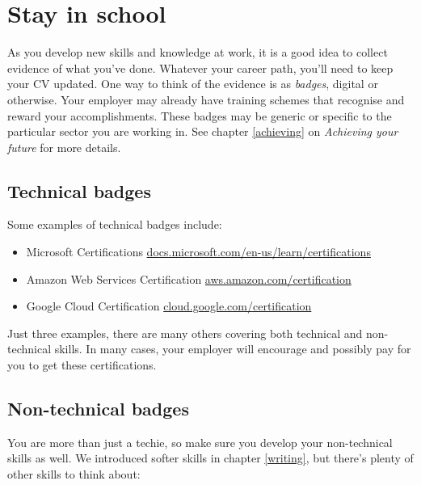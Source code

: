 \documentclass[
]{book}
\providecommand{\tightlist}{%
  \setlength{\itemsep}{0pt}\setlength{\parskip}{0pt}}
\begin{document}
\hypertarget{neverstoplearning}{%
\section{Stay in school}\label{neverstoplearning}}

As you develop new skills and knowledge at work, it is a good idea to collect evidence of what you've done. Whatever your career path, you'll need to keep your CV updated. One way to think of the evidence is as \emph{badges}, digital or otherwise. Your employer may already have training schemes that recognise and reward your accomplishments. These badges may be generic or specific to the particular sector you are working in. See chapter \ref{achieving} on \emph{Achieving your future} for more details.

\hypertarget{techie}{%
\subsection{Technical badges}\label{techie}}

Some examples of technical badges include:

\begin{itemize}
\tightlist
\item
  Microsoft Certifications \href{https://docs.microsoft.com/en-us/learn/certifications/}{docs.microsoft.com/en-us/learn/certifications}
\item
  Amazon Web Services Certification \href{https://aws.amazon.com/certification/}{aws.amazon.com/certification}
\item
  Google Cloud Certification \href{https://cloud.google.com/certification}{cloud.google.com/certification}
\end{itemize}

Just three examples, there are many others covering both technical and non-technical skills. In many cases, your employer will encourage and possibly pay for you to get these certifications.

\hypertarget{techieplusplus}{%
\subsection{Non-technical badges}\label{techieplusplus}}

You are more than just a techie, so make sure you develop your non-technical skills as well. We introduced softer skills in chapter \ref{writing}, but there's plenty of other skills to think about:
\end{document}
